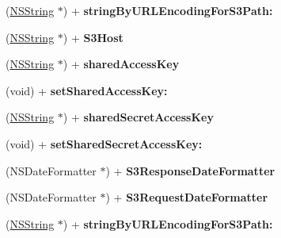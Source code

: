 \begin{DoxyCompactItemize}
\item 
\hypertarget{interface_a_s_i_s3_request_aab8bdd9f5d8970a3bcfca36ec9dee9fb}{
(\hyperlink{class_n_s_string}{\-N\-S\-String} $\ast$) + {\bfseries string\-By\-U\-R\-L\-Encoding\-For\-S3\-Path\-:}}
\label{interface_a_s_i_s3_request_aab8bdd9f5d8970a3bcfca36ec9dee9fb}

\item 
\hypertarget{interface_a_s_i_s3_request_ae49e83f64fb2490185d0a9ff3649e1d3}{
(\hyperlink{class_n_s_string}{\-N\-S\-String} $\ast$) + {\bfseries \-S3\-Host}}
\label{interface_a_s_i_s3_request_ae49e83f64fb2490185d0a9ff3649e1d3}

\item 
\hypertarget{interface_a_s_i_s3_request_aadbf1f29ab30efc3f4640bac7b508d32}{
(\hyperlink{class_n_s_string}{\-N\-S\-String} $\ast$) + {\bfseries shared\-Access\-Key}}
\label{interface_a_s_i_s3_request_aadbf1f29ab30efc3f4640bac7b508d32}

\item 
\hypertarget{interface_a_s_i_s3_request_ad944a2a1b20fc9e4559c8faf4f41b977}{
(void) + {\bfseries set\-Shared\-Access\-Key\-:}}
\label{interface_a_s_i_s3_request_ad944a2a1b20fc9e4559c8faf4f41b977}

\item 
\hypertarget{interface_a_s_i_s3_request_af1a72a1aacc05ce3f5def339d3bfbd5f}{
(\hyperlink{class_n_s_string}{\-N\-S\-String} $\ast$) + {\bfseries shared\-Secret\-Access\-Key}}
\label{interface_a_s_i_s3_request_af1a72a1aacc05ce3f5def339d3bfbd5f}

\item 
\hypertarget{interface_a_s_i_s3_request_aca8ba2305c0cbee1d7ec8553831768ff}{
(void) + {\bfseries set\-Shared\-Secret\-Access\-Key\-:}}
\label{interface_a_s_i_s3_request_aca8ba2305c0cbee1d7ec8553831768ff}

\item 
\hypertarget{interface_a_s_i_s3_request_ac0d60115b59954ffcc2e293c60321a74}{
(\-N\-S\-Date\-Formatter $\ast$) + {\bfseries \-S3\-Response\-Date\-Formatter}}
\label{interface_a_s_i_s3_request_ac0d60115b59954ffcc2e293c60321a74}

\item 
\hypertarget{interface_a_s_i_s3_request_ac2da1def71701c5ed345a2e119dad803}{
(\-N\-S\-Date\-Formatter $\ast$) + {\bfseries \-S3\-Request\-Date\-Formatter}}
\label{interface_a_s_i_s3_request_ac2da1def71701c5ed345a2e119dad803}

\item 
\hypertarget{interface_a_s_i_s3_request_aab8bdd9f5d8970a3bcfca36ec9dee9fb}{
(\hyperlink{class_n_s_string}{\-N\-S\-String} $\ast$) + {\bfseries string\-By\-U\-R\-L\-Encoding\-For\-S3\-Path\-:}}
\label{interface_a_s_i_s3_request_aab8bdd9f5d8970a3bcfca36ec9dee9fb}


\end{DoxyCompactItemize}
